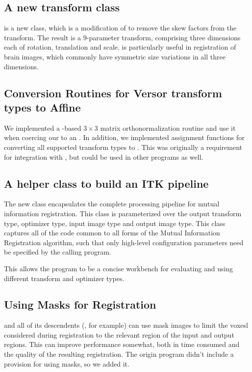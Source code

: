 \documentclass{InsightArticle}
\begin{document}
\subsection{A new transform class}
 is a new 
class, which is a modification of
 to remove the skew factors from
the transform.  The result is a 9-parameter transform, comprising
three dimensions each of rotation, translation and scale.
 is particularly useful in
registration of brain images, which commonly have symmetric size
variations in all three dimensions.

\subsection{Conversion Routines for Versor transform types to Affine}
We implemented a -based $3 \times{} 3$ matrix orthonormalization
routine and use it when coercing our  to an
.  In addition, we implemented
assignment functions for converting all supported transform types to
. This was originally a requirement for
integration with \brainstwoprog{}, but could be used in other programs
as well.

\subsection{A helper class to build an ITK pipeline}
The new class 
encapsulates the complete processing pipeline for mutual information
registration.  This class is parameterized over the output transform
type, optimizer type, input image type and output image type.  This
class captures all of the code common to all forms of the Mutual
Information Registration algorithm, such that only high-level
configuration parameters need be specified by the calling program.

This allows the  program to be a
concise workbench for evaluating and using different transform and
optimizer types.

\subsection{Using Masks for Registration}
 and all of its descendents
(, for example)
can use mask images to limit the voxesl considered during registration to the
relevant region of the input and output regions. This can improve
performance somewhat, both in time consumed and the quality of the
resulting registration.  The origin 
program didn't include a provision for using masks, so we added it.
\end{document}
